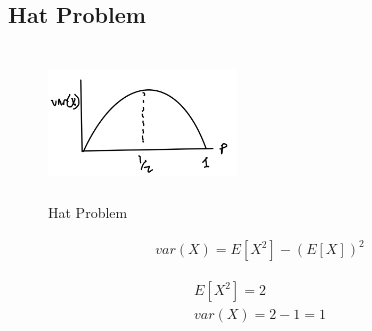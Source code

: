 \subsection{Hat Problem}


\begin{figure}[ht]
\centering
\includegraphics[width=5cm, height=4cm]{images/L07/bin_hat_problem.jpeg}
\caption{Hat Problem}
\end{figure}


\begin{align}
var(X) = E[X^2] - (E[X])^2
\label{eq:var_moments}
\end{align}

\begin{align*}
E[X^2]=2\\
var(X)=2-1=1
\end{align*}